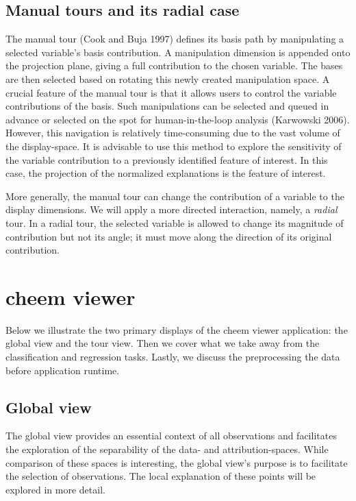 \documentclass[
  article]{article}
\begin{document}
\hypertarget{manual-tours-and-its-radial-case}{%
\subsection{Manual tours and its radial case}\label{manual-tours-and-its-radial-case}}

The manual tour (Cook and Buja 1997) defines its basis path by manipulating a selected variable's basis contribution. A manipulation dimension is appended onto the projection plane, giving a full contribution to the chosen variable. The bases are then selected based on rotating this newly created manipulation space. A crucial feature of the manual tour is that it allows users to control the variable contributions of the basis. Such manipulations can be selected and queued in advance or selected on the spot for human-in-the-loop analysis (Karwowski 2006). However, this navigation is relatively time-consuming due to the vast volume of the display-space. It is advisable to use this method to explore the sensitivity of the variable contribution to a previously identified feature of interest. In this case, the projection of the normalized explanations is the feature of interest.

More generally, the manual tour can change the contribution of a variable to the display dimensions. We will apply a more directed interaction, namely, a \emph{radial} tour. In a radial tour, the selected variable is allowed to change its magnitude of contribution but not its angle; it must move along the direction of its original contribution.

\hypertarget{sec:applicationdesign}{%
\section{cheem viewer}\label{sec:applicationdesign}}

Below we illustrate the two primary displays of the cheem viewer application: the global view and the tour view. Then we cover what we take away from the classification and regression tasks. Lastly, we discuss the preprocessing the data before application runtime.

\hypertarget{global-view}{%
\subsection{Global view}\label{global-view}}

The global view provides an essential context of all observations and facilitates the exploration of the separability of the data- and attribution-spaces. While comparison of these spaces is interesting, the global view's purpose is to facilitate the selection of observations. The local explanation of these points will be explored in more detail.
\end{document}
